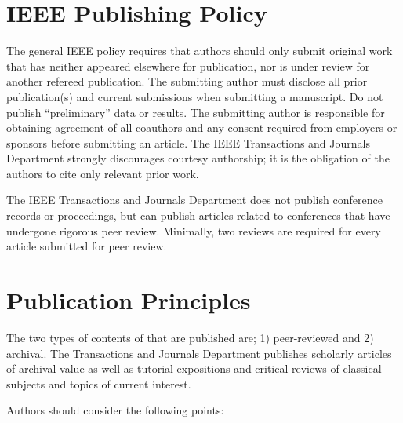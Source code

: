 \documentclass[twoside,web]{ieeecolor}
\begin{document}
\section{IEEE Publishing Policy}
The general IEEE policy requires that authors should only submit original 
work that has neither appeared elsewhere for publication, nor is under 
review for another refereed publication. The submitting author must disclose 
all prior publication(s) and current submissions when submitting a 
manuscript. Do not publish ``preliminary'' data or results. The submitting 
author is responsible for obtaining agreement of all coauthors and any 
consent required from employers or sponsors before submitting an article. 
The IEEE Transactions and Journals Department strongly discourages courtesy 
authorship; it is the obligation of the authors to cite only relevant prior 
work.

The IEEE Transactions and Journals Department does not publish conference 
records or proceedings, but can publish articles related to conferences that 
have undergone rigorous peer review. Minimally, two reviews are required for 
every article submitted for peer review.

\section{Publication Principles}
The two types of contents of that are published are; 1) peer-reviewed and 2) 
archival. The Transactions and Journals Department publishes scholarly 
articles of archival value as well as tutorial expositions and critical 
reviews of classical subjects and topics of current interest. 

Authors should consider the following points:
\end{document}
